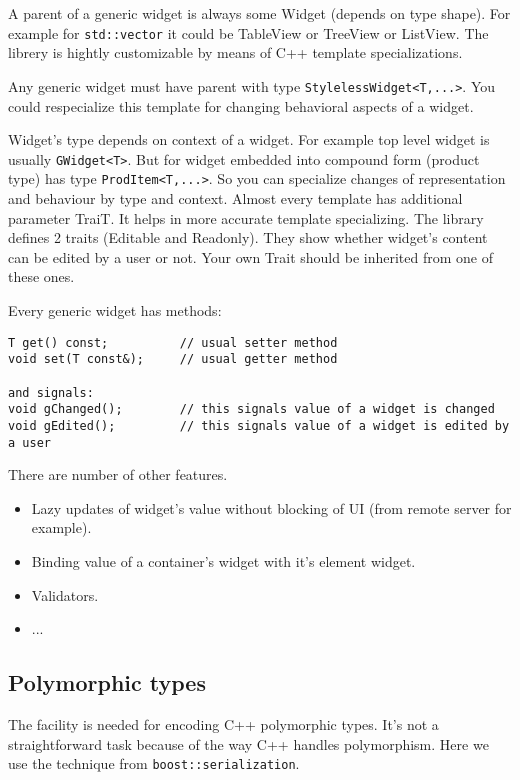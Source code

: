 \documentclass[a4paper]{article}
\begin{document}
A parent of a generic widget is always some Widget (depends on type shape).
For example for \lstinline$std::vector$ it could be TableView or TreeView or ListView.
The librery is hightly customizable by means of C++ template specializations.

Any generic widget must have parent with type \lstinline$StylelessWidget<T,...>$.
You could respecialize this template for changing behavioral aspects of a widget.

Widget's type depends on context of a widget. For example top level widget is usually \lstinline$GWidget<T>$.
But for widget embedded into compound form (product type) has type \lstinline$ProdItem<T,...>$.
So you can specialize changes of representation and behaviour by type and context.
Almost every template has additional parameter TraiT. It helps in more accurate template specializing.
The library defines 2 traits (Editable and Readonly). They show whether widget's content can be edited by a user or not.
Your own Trait should be inherited from one of these ones.

Every generic widget has methods:

\begin{lstlisting}
T get() const;			// usual setter method
void set(T const&);		// usual getter method

and signals:
void gChanged();		// this signals value of a widget is changed
void gEdited();			// this signals value of a widget is edited by a user
\end{lstlisting}

There are number of other features.

\begin{itemize}
\item Lazy updates of widget's value without blocking of UI (from remote server for example).
\item Binding value of a container's widget with it's element widget.
\item Validators.
\item ...
\end{itemize}

\subsection{Polymorphic types}

The facility is needed for encoding C++ polymorphic types. It's not a straightforward task because of the way C++ handles polymorphism. 
Here we use the technique from \lstinline$boost::serialization$.
\end{document}
